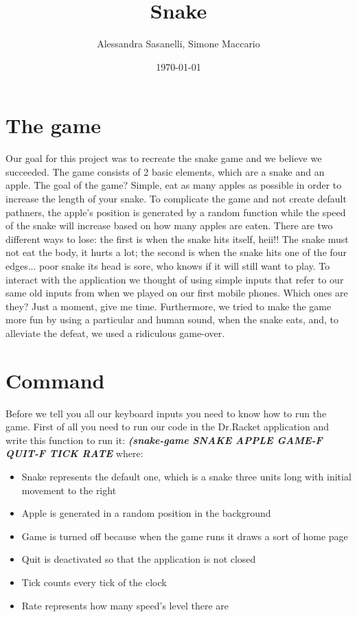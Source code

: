 \documentclass{article}
\title{Snake}
\author{Alessandra Sasanelli, Simone Maccario}
\date{\today}
\begin{document}
	\maketitle
	
	\section{The game}
	Our goal for this project was to recreate the snake game and we believe we succeeded.
	The game consists of 2 basic elements, which are a snake and an apple. The goal of the game? Simple, eat as many apples as possible in order to increase the length of your snake. To complicate the game and not create default pathners, the apple's position is generated by a random function while the speed of the snake will increase based on how many apples are eaten.
	There are two different ways to lose: the first is when the snake hits itself, heii!! The snake must not eat the body, it hurts a lot; the second is when the snake hits one of the four edges... poor snake its head is sore, who knows if it will still want to play.
	To interact with the application we thought of using simple inputs that refer to our same old inputs from when we played on our first mobile phones. Which ones are they? Just a moment, give me time.
	Furthermore, we tried to make the game more fun by using a particular and human sound, when the snake eats, and, to alleviate the defeat, we used a ridiculous game-over.
	
	\section{Command}	
	Before we tell you all our keyboard inputs you need to know how to run the game. First of all you need to run our code in the Dr.Racket application and write this function to run it: \textbf{\emph{(snake-game SNAKE APPLE GAME-F QUIT-F TICK RATE}} where:
	
	\begin{itemize}
		\item Snake represents the default one, which is a snake three units long with initial movement to the right
		\item Apple is generated in a random position in the background
		\item Game is turned off because when the game runs it draws a sort of home page
		\item Quit is deactivated so that the application is not closed
		\item Tick counts every tick of the clock
		\item Rate represents how many speed's level there are
	\end{itemize}
	
\end{document}

